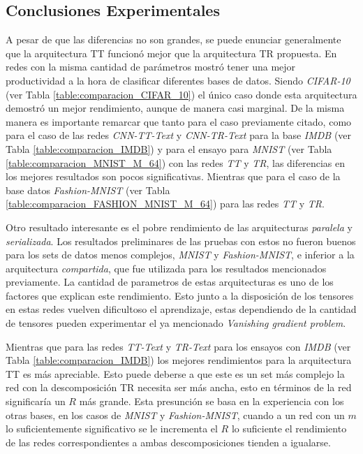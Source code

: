 \documentclass[spanish]{article}
\theoremstyle{definition}
\theoremstyle{remark}
\numberwithin{equation}{section}
\numberwithin{equation}{section} %
\begin{document}
\subsection{Conclusiones Experimentales}
A pesar de que las diferencias no son grandes, se puede enunciar generalmente que la arquitectura TT funcionó mejor que la arquitectura TR propuesta. En redes con la misma cantidad de parámetros mostró tener una mejor productividad a la hora de clasificar diferentes bases de datos. Siendo \textit{CIFAR-10} (ver Tabla \ref{table:comparacion_CIFAR_10}) el único caso donde esta arquitectura demostró un mejor rendimiento, aunque de manera casi marginal. De la misma manera es importante remarcar que tanto para el caso previamente citado, como para el caso de las redes \textit{CNN-TT-Text} y \textit{CNN-TR-Text} para la base \textit{IMDB} (ver Tabla \ref{table:comparacion_IMDB}) y para el ensayo para \textit{MNIST} (ver Tabla \ref{table:comparacion_MNIST_M_64}) con las redes \textit{TT} y \textit{TR}, las diferencias en los mejores resultados son pocos significativas. Mientras que para el caso de la base datos \textit{Fashion-MNIST} (ver Tabla \ref{table:comparacion_FASHION_MNIST_M_64}) para las redes \textit{TT} y \textit{TR}. 
\par
Otro resultado interesante es el pobre rendimiento de las arquitecturas \textit{paralela} y \textit{serializada}. Los resultados preliminares de las pruebas con estos no fueron buenos para los sets de datos menos complejos, \textit{MNIST} y \textit{Fashion-MNIST}, e inferior a la arquitectura \textit{compartida}, que fue utilizada para los resultados mencionados previamente. La cantidad de parametros de estas arquitecturas es uno de los factores que explican este rendimiento. Esto junto a la disposición de los tensores en estas redes vuelven dificultoso el aprendizaje, estas dependiendo de la cantidad de tensores pueden experimentar el ya mencionado \textit{Vanishing gradient problem}.    
\par 
Mientras que para las redes \textit{TT-Text} y \textit{TR-Text} para los ensayos con \textit{IMDB} (ver Tabla \ref{table:comparacion_IMDB}) los mejores rendimientos para la arquitectura TT es más apreciable. Esto puede deberse 
a que este es un set más complejo la red con la descomposición TR necesita ser más ancha, esto en términos de la red significaría un $R$ más grande. Esta presunción se basa en la experiencia con los otras bases, en los casos de  \textit{MNIST} y \textit{Fashion-MNIST}, cuando a un red con un $m$ lo suficientemente significativo se le incrementa el $R$ lo suficiente el rendimiento de las redes correspondientes a ambas descomposiciones tienden a igualarse. 
\end{document}
